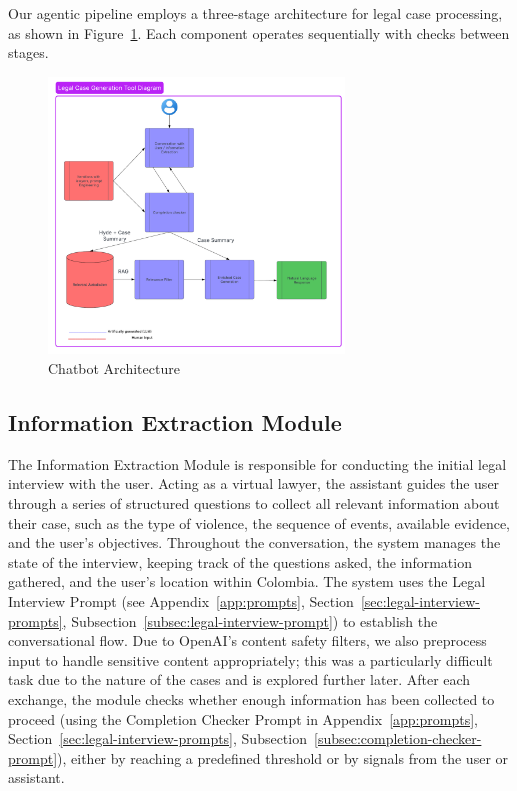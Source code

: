 Our agentic pipeline employs a three-stage architecture for legal case processing, 
as shown in Figure~\ref{fig:chatbot_architecture}. 
Each component operates sequentially with checks between stages.

\begin{figure}[htbp]
    \centering
    \includegraphics[width=0.7\textwidth]{figures/Chatbot_arch.png}
    \caption{Chatbot Architecture}
    \label{fig:chatbot_architecture}
\end{figure}

\subsection{Information Extraction Module}
The Information Extraction Module is responsible for conducting the initial legal interview with the user. 
Acting as a virtual lawyer, the assistant guides the user through a series of structured questions to collect 
all relevant information about their case, such as the type of violence, the sequence of events, available evidence, 
and the user's objectives. Throughout the conversation, the system manages the state of the interview, keeping track of 
the questions asked, the information gathered, and the user's location within Colombia. The system uses the Legal Interview Prompt 
(see Appendix~\ref{app:prompts}, Section~\ref{sec:legal-interview-prompts}, Subsection~\ref{subsec:legal-interview-prompt}) 
to establish the conversational flow. Due to OpenAI's content safety filters, 
we also preprocess input to handle sensitive content appropriately; this was a particularly difficult task due to the nature 
of the cases and is explored further later. 
After each exchange, the module checks whether enough information has been collected to proceed 
(using the Completion Checker Prompt in Appendix~\ref{app:prompts}, Section~\ref{sec:legal-interview-prompts}, 
Subsection~\ref{subsec:completion-checker-prompt}), either by reaching a predefined threshold or 
by signals from the user or assistant.
